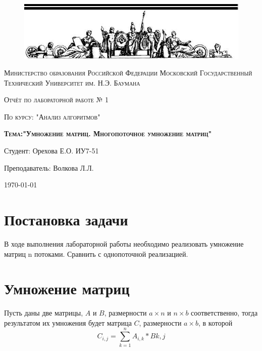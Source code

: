 \documentclass[a4paper,12pt]{article}
\begin{document}
\begin{titlepage}
	\centering
    \begin{figure}[H]
    	\includegraphics[scale=1.2]{photo}
   	\end{figure}
	{\scshape Министерство образования Российской Федерации
Московский Государственный Технический Университет им. Н.Э. Баумана \par}
	\vspace{4cm}
	{\scshape\Large Отчёт по лабораторной работе № 1\par}
    {\scshape\Large По курсу: "Анализ алгоритмов"\par}
	{\scshape\Large\bf Тема:"Умножение матриц. Многопоточное умножение матриц"\par}
    \vspace{2cm}
    {\flushright Студент: Орехова Е.О. ИУ7-51\par
    \flushright Преподаватель: Волкова Л.Л.\par}
    \vspace{2cm}
	{\large \today\par}
\end{titlepage}

\def\contentaname{Содержание}
\tableofcontents %
\clearpage

\section{Постановка задачи}
    В ходе выполнения лабораторной работы необходимо реализовать умножение матриц n потоками. Сравнить с однопоточной реализацией.

\section{Умножение матриц}
    Пусть даны две матрицы, $A$ и $B$, размерности $a \times n$ и $n \times b$ соответственно, тогда результатом их умножения будет матрица $C$, размерности $a \times b$, в которой
    \begin{equation}
    	C_{i,j} = \sum_{k = 1}^{n} A_{i,k}*B{k,j}
    \end{equation}
\end{document}
